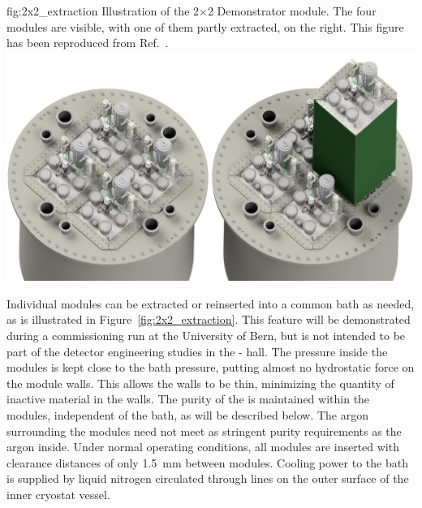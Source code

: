 \begin{dunefigure}{fig:2x2_extraction}
{Illustration of the  2$\times$2 Demonstrator module. The four modules are visible, with one of them partly extracted, on the right. This figure has been reproduced from Ref.~\cite{argoncube_loi}.}
\includegraphics[width=\textwidth]{graphics/BathAndModule.jpeg}
\end{dunefigure}

Individual modules can be extracted or reinserted into a common  bath as needed, as is illustrated in Figure~\ref{fig:2x2_extraction}. This feature will be demonstrated during a commissioning run at the University of Bern, but is not intended to be part of the detector engineering studies in the - hall. The pressure inside the modules is kept close to the bath pressure, putting almost no hydrostatic force on the module walls.  This allows the walls to be thin, minimizing the quantity of inactive material in the walls. The purity of the  is maintained within the modules, independent of the bath, as will be described below. The argon surrounding the modules need not meet as stringent purity requirements as the argon inside. Under normal operating conditions, all modules are inserted with  clearance distances of only \SI{1.5}{\milli\metre} between modules. Cooling power to the bath is supplied by liquid nitrogen circulated through lines on the outer surface of the inner cryostat vessel.

